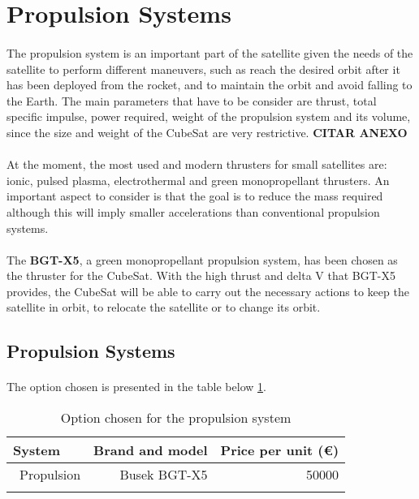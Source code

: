 \section{Propulsion Systems}

\paragraph{}The propulsion system is an important part of the satellite given the needs of the satellite to perform different maneuvers, such as reach the desired orbit after it has been deployed from the rocket, and to maintain the orbit and avoid falling to the Earth. The main parameters that have to be consider are thrust, total specific impulse, power required, weight of the propulsion system and its volume, since the size and weight of the CubeSat are very restrictive. \textbf{CITAR ANEXO}

\paragraph{}At the moment, the most used and modern thrusters for small satellites are: ionic, pulsed plasma, electrothermal and green monopropellant thrusters. An important aspect to consider is that the goal is to reduce the mass required although this will imply smaller accelerations than conventional propulsion systems.

\paragraph{}The \textbf{BGT-X5}, a green monopropellant propulsion system, has been chosen as the thruster for the CubeSat. With the high thrust and delta V that BGT-X5 provides, the CubeSat will be able to carry out the necessary actions to keep the satellite in orbit, to relocate the satellite or to change its orbit.

\subsection{Propulsion Systems}
\paragraph{}The option chosen is presented in the table below \ref{propulsionfinal}.

\begin{longtable}{| l | r | r | }
\hline
\rowcolor[gray]{0.80}	\textbf{System} &  \textbf{Brand and model}     & \textbf{Price per unit (\euro)}   \\
\hline
\endfirsthead

	   ~Propulsion & Busek BGT-X5 & 50000 \\
	\hline

\caption{Option chosen for the propulsion system}
\label{propulsionfinal}
\end{longtable}
